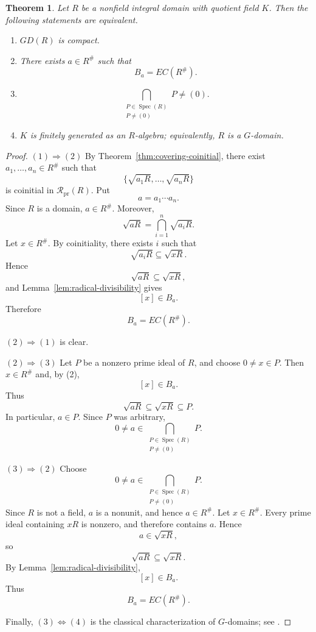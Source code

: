 \documentclass[11pt]{amsart}
\theoremstyle{plain}
\newtheorem{theorem}{Theorem}[section]
\theoremstyle{definition}
\theoremstyle{remark}
\numberwithin{equation}{section}
\begin{document}
\begin{theorem}\label{thm:compact-G-domain}
	Let $R$ be a nonfield integral domain with quotient field $K$. Then the
	following statements are equivalent.
	\begin{enumerate}
		\item $GD(R)$ is compact.
		
		\item There exists $a\in R^\#$ such that
		\[
		B_a=EC(R^\#).
		\]
		
		\item
		\[
		\bigcap_{\substack{P\in\operatorname{Spec}(R)\\P\neq(0)}}P
		\neq(0).
		\]
		
		\item $K$ is finitely generated as an $R$-algebra; equivalently,
		$R$ is a $G$-domain.
	\end{enumerate}
\end{theorem}

\begin{proof}
	$(1)\Rightarrow(2)$
	By Theorem~\ref{thm:covering-coinitial}, there exist
	$a_1,\ldots,a_n\in R^\#$ such that
	\[
	\{\sqrt{a_1R},\ldots,\sqrt{a_nR}\}
	\]
	is coinitial in $\mathcal R_{\mathrm{pr}}(R)$. Put
	\[
	a=a_1\cdots a_n.
	\]
	Since $R$ is a domain, $a\in R^\#$. Moreover,
	\[
	\sqrt{aR}
	=
	\bigcap_{i=1}^n\sqrt{a_iR}.
	\]
	Let $x\in R^\#$. By coinitiality, there exists $i$ such that
	\[
	\sqrt{a_iR}\subseteq\sqrt{xR}.
	\]
	Hence
	\[
	\sqrt{aR}\subseteq\sqrt{xR},
	\]
	and Lemma~\ref{lem:radical-divisibility} gives
	\[
	[x]\in B_a.
	\]
	Therefore
	\[
	B_a=EC(R^\#).
	\]
	
	$(2)\Rightarrow(1)$ is clear.
	
	$(2)\Rightarrow(3)$
	Let $P$ be a nonzero prime ideal of $R$, and choose
	$0\neq x\in P$. Then $x\in R^\#$ and, by (2),
	\[
	[x]\in B_a.
	\]
	Thus
	\[
	\sqrt{aR}\subseteq\sqrt{xR}\subseteq P.
	\]
	In particular, $a\in P$. Since $P$ was arbitrary,
	\[
	0\neq a\in
	\bigcap_{\substack{P\in\operatorname{Spec}(R)\\P\neq(0)}}P.
	\]
	
	$(3)\Rightarrow(2)$
	Choose
	\[
	0\neq a\in
	\bigcap_{\substack{P\in\operatorname{Spec}(R)\\P\neq(0)}}P.
	\]
	Since $R$ is not a field, $a$ is a nonunit, and hence $a\in R^\#$.
	Let $x\in R^\#$. Every prime ideal containing $xR$ is nonzero, and
	therefore contains $a$. Hence
	\[
	a\in\sqrt{xR},
	\]
	so
	\[
	\sqrt{aR}\subseteq\sqrt{xR}.
	\]
	By Lemma~\ref{lem:radical-divisibility},
	\[
	[x]\in B_a.
	\]
	Thus
	\[
	B_a=EC(R^\#).
	\]
	
	Finally, $(3)\Leftrightarrow(4)$ is the classical characterization of
	$G$-domains; see \cite{Kaplansky}.
\end{proof}
\end{document}
